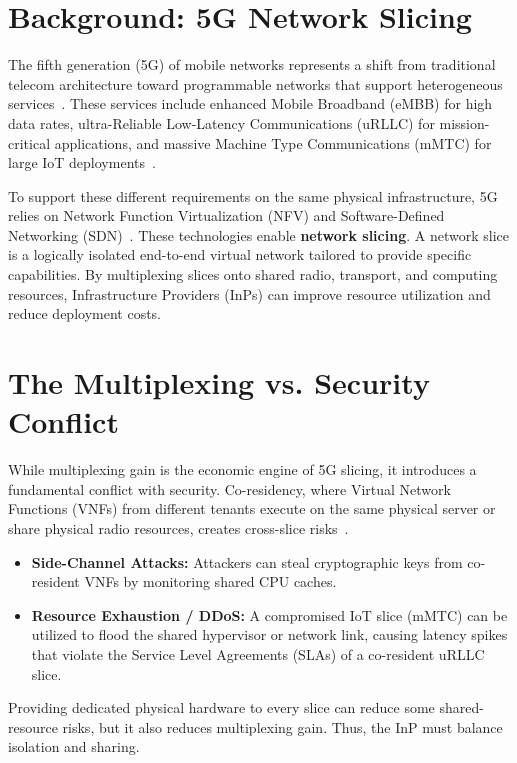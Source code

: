 \section{Background: 5G Network Slicing}\label{sec:intro-background}
The fifth generation (5G) of mobile networks represents a shift from traditional telecom architecture toward programmable networks that support heterogeneous services~\cite{foukas2017slicing,rost2017scalability,kaloxylos2018survey,zhang2017mobility}. These services include enhanced Mobile Broadband (eMBB) for high data rates, ultra-Reliable Low-Latency Communications (uRLLC) for mission-critical applications, and massive Machine Type Communications (mMTC) for large IoT deployments~\cite{ferrus2018ran,nguyen2020iot}.

To support these different requirements on the same physical infrastructure, 5G relies on Network Function Virtualization (NFV) and Software-Defined Networking (SDN)~\cite{ordonez2017sdnnfv,afolabi2018softwarization,barakabitze2020taxonomy,nguyen2017packetcore}. These technologies enable \textbf{network slicing}. A network slice is a logically isolated end-to-end virtual network tailored to provide specific capabilities. By multiplexing slices onto shared radio, transport, and computing resources, Infrastructure Providers (InPs) can improve resource utilization and reduce deployment costs.

\section{The Multiplexing vs. Security Conflict}\label{sec:intro-conflict}
While multiplexing gain is the economic engine of 5G slicing, it introduces a fundamental conflict with security. Co-residency, where Virtual Network Functions (VNFs) from different tenants execute on the same physical server or share physical radio resources, creates cross-slice risks~\cite{kotulski2017isolation,lal2017nfvsecurity,wang2022security,ferrag2018cellular}.
\begin{itemize}
    \item \textbf{Side-Channel Attacks:} Attackers can steal cryptographic keys from co-resident VNFs by monitoring shared CPU caches.
    \item \textbf{Resource Exhaustion / DDoS:} A compromised IoT slice (mMTC) can be utilized to flood the shared hypervisor or network link, causing latency spikes that violate the Service Level Agreements (SLAs) of a co-resident uRLLC slice.
\end{itemize}
Providing dedicated physical hardware to every slice can reduce some shared-resource risks, but it also reduces multiplexing gain. Thus, the InP must balance isolation and sharing.


